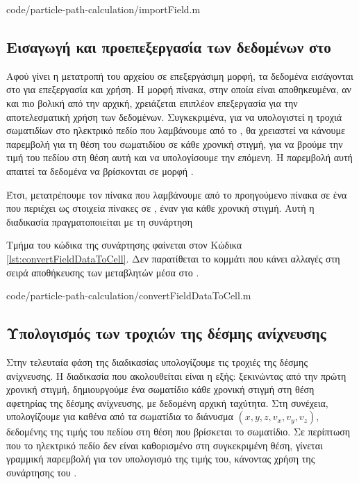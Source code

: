 
{code/particle-path-calculation/importField.m}

\subsection{Εισαγωγή και προεπεξεργασία των δεδομένων στο }

Αφού γίνει η μετατροπή του αρχείου σε επεξεργάσιμη μορφή, τα δεδομένα εισάγονται στο  για επεξεργασία και χρήση.
Η μορφή πίνακα, στην οποία είναι αποθηκευμένα, αν και πιο βολική από την αρχική, χρειάζεται επιπλέον επεξεργασία για την αποτελεσματική χρήση των δεδομένων.
Συγκεκριμένα, για να υπολογιστεί η τροχιά σωματιδίων στο ηλεκτρικό πεδίο που λαμβάνουμε από το , θα χρειαστεί να κάνουμε παρεμβολή για τη θέση του σωματιδίου σε κάθε χρονική στιγμή, για να βρούμε την τιμή του πεδίου στη θέση αυτή και να υπολογίσουμε την επόμενη. 
Η παρεμβολή αυτή απαιτεί τα δεδομένα να βρίσκονται σε μορφή .

Έτσι, μετατρέπουμε τον πίνακα που λαμβάνουμε από το προηγούμενο πίνακα σε ένα  που περιέχει ως στοιχεία πίνακες σε , έναν για κάθε χρονική στιγμή. 
Αυτή η διαδικασία πραγματοποιείται με τη συνάρτηση 

Τμήμα του κώδικα της συνάρτησης φαίνεται στον Κώδικα \ref{lst:convertFieldDataToCell}. 
Δεν παρατίθεται το κομμάτι που κάνει αλλαγές στη σειρά αποθήκευσης των μεταβλητών μέσα στο .


{code/particle-path-calculation/convertFieldDataToCell.m}

\subsection{Υπολογισμός των τροχιών της δέσμης ανίχνευσης}

Στην τελευταία φάση της διαδικασίας υπολογίζουμε τις τροχιές της δέσμης ανίχνευσης.
Η διαδικασία που ακολουθείται είναι η εξής: ξεκινώντας από την πρώτη χρονική στιγμή, δημιουργούμε ένα σωματίδιο κάθε χρονική στιγμή στη θέση αφετηρίας της δέσμης ανίχνευσης, με δεδομένη αρχική ταχύτητα.
Στη συνέχεια, υπολογίζουμε για καθένα από τα σωματίδια το διάνυσμα $\left(x, y, z, v_x, v_y, v_z\right)$, δεδομένης της τιμής  του πεδίου στη θέση που βρίσκεται το σωματίδιο.
Σε περίπτωση που το ηλεκτρικό πεδίο δεν είναι καθορισμένο στη συγκεκριμένη θέση, γίνεται γραμμική παρεμβολή για τον υπολογισμό της τιμής του, κάνοντας χρήση της συνάρτησης του  .

